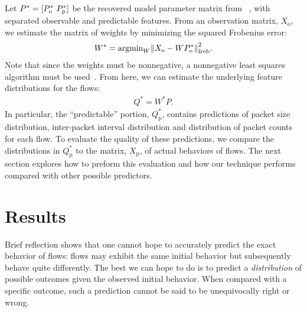 \documentclass{acm_proc_article-sp}
\begin{document}

Let $P^* = {[P^*_\text{o}~P^*_\text{p}]}$ be the recovered model parameter matrix from ~, with separated observable and predictable features.\separationnote
From an observation matrix, $X_\text{o}$, we estimate the matrix of weights by minimizing the squared Frobenius error:
\begin{align}
  W^* = \text{argmin}_W {{\left\lVert X_\text{o} - W P^*_\text{o}\right\rVert}^2_\text{frob}}.
\end{align}
Note that since the weights must be nonnegative, a nonnegative least squares algorithm must be used~\cite{Benthem04,Kim08:block-pivot}.
From here, we can estimate the underlying feature distributions for the flows:
\begin{align}
  Q^* = W^*P.
\end{align}
In particular, the ``predictable'' portion, $Q^*_\text{p}$, contains predictions of packet size distribution, inter-packet interval distribution and distribution of packet counts for each flow.
To evaluate the quality of these predictions, we compare the distributions in $Q^*_\text{p}$ to the matrix, $X_\text{p}$, of actual behaviors of flows.
The next section explores how to preform this evaluation and how our technique performs compared with other possible predictors. 

\section{Results}

Brief reflection shows that one cannot hope to accurately predict the exact behavior of flows:
flows may exhibit the same initial behavior but subsequently behave quite differently.
The best we can hope to do is to predict a \emph{distribution} of possible outcomes given the observed initial behavior.
When compared with a specific outcome, such a prediction cannot be said to be unequivocally right or wrong.
\end{document}
